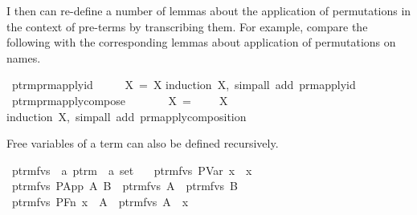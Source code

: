 I then can re-define a number of lemmas about the application of permutations in the context of pre-terms by transcribing them.
For example, compare the following with the corresponding lemmas about application of permutations on names.

\begin{implementation}
\isamarkupfalse%
\ ptrm{\isacharunderscore}prm{\isacharunderscore}apply{\isacharunderscore}id{\isacharcolon}\isanewline
\ \ \ {\isachardoublequoteopen}{\isasymepsilon}\ {\isasymbullet}\ X\ =\ X{\isachardoublequoteclose}\isanewline
\isatagproof
{}\isamarkupfalse%
{\isacharparenleft}induction\ X,\ simp{\isacharunderscore}all\ add{\isacharcolon}\ prm{\isacharunderscore}apply{\isacharunderscore}id{\isacharparenright}%
\endisatagproof
\isanewline
\isanewline
{}\isamarkupfalse%
\ ptrm{\isacharunderscore}prm{\isacharunderscore}apply{\isacharunderscore}compose{\isacharcolon}\isanewline
\ \ \ {\isachardoublequoteopen}{\isasympi}\ {\isasymbullet}\ {\isasymsigma}\ {\isasymbullet}\ X\ =\ {\isacharparenleft}{\isasympi}\ {\isasymdiamondop}\ {\isasymsigma}{\isacharparenright}\ {\isasymbullet}\ X{\isachardoublequoteclose}\isanewline
\isatagproof
{}\isamarkupfalse%
{\isacharparenleft}induction\ X,\ simp{\isacharunderscore}all\ add{\isacharcolon}\ prm{\isacharunderscore}apply{\isacharunderscore}composition{\isacharparenright}%
\endisatagproof
\end{implementation}

Free variables of a term can also be defined recursively.

\begin{implementation}
\isamarkupfalse%
\ ptrm{\isacharunderscore}fvs\ {\isacharcolon}{\isacharcolon}\ {\isachardoublequoteopen}{\isacharprime}a\ ptrm\ {\isasymRightarrow}\ {\isacharprime}a\ set{\isachardoublequoteclose}\ \isanewline
\ \ {\isachardoublequoteopen}ptrm{\isacharunderscore}fvs\ {\isacharparenleft}PVar\ x{\isacharparenright}\ {\isacharequal}\ {\isacharbraceleft}x{\isacharbraceright}{\isachardoublequoteclose}\isanewline
{\isacharbar}\ {\isachardoublequoteopen}ptrm{\isacharunderscore}fvs\ {\isacharparenleft}PApp\ A\ B{\isacharparenright}\ {\isacharequal}\ ptrm{\isacharunderscore}fvs\ A\ {\isasymunion}\ ptrm{\isacharunderscore}fvs\ B{\isachardoublequoteclose}\isanewline
{\isacharbar}\ {\isachardoublequoteopen}ptrm{\isacharunderscore}fvs\ {\isacharparenleft}PFn\ x\ {\isacharunderscore}\ A{\isacharparenright}\ {\isacharequal}\ ptrm{\isacharunderscore}fvs\ A\ {\isacharminus}\ {\isacharbraceleft}x{\isacharbraceright}{\isachardoublequoteclose}\isanewline
\end{implementation}

